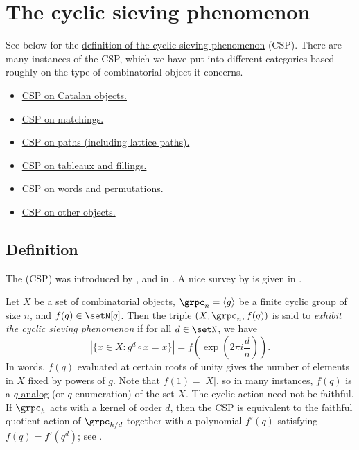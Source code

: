 

\section[cyclicSieving]{The cyclic sieving phenomenon}

See below for the \hyperref[cspDefinition]{definition of the cyclic sieving phenomenon} (CSP).
There are many instances of the CSP, which we have put into different categories
based roughly on the type of combinatorial object it concerns.
\begin{itemize}
\item \hyperref[cspCatalan]{CSP on Catalan objects.}
\item \hyperref[cspMatch]{CSP on matchings.}
\item \hyperref[cspPath]{CSP on paths (including lattice paths).}
\item \hyperref[cspTableau]{CSP on tableaux and fillings.}
\item \hyperref[cspWord]{CSP on words and permutations.}
\item \hyperref[cspMisc]{CSP on other objects.}
\end{itemize}


\subsection[cspDefinition]{Definition}

The  (CSP) was introduced by ,  and 
 in \cite{ReinerStantonWhite2004}. 
A nice survey by  is given in \cite{Sagan2011}.

Let $X$ be a set of combinatorial objects, $\grpc_n = \langle g \rangle$ be a finite cyclic group of size $n$, and $f(q) \in \setN[q]$.
Then the triple $(X,\grpc_n,f(q))$ is said to \emph{exhibit the cyclic sieving phenomenon} if for all $d \in \setN$, we have
\[
|\{x \in X : g^d \circ x =x \}| = f\left(\exp\left(2\pi i  \frac{d}{n}\right)\right).
\]
In words, $f(q)$ evaluated at certain roots of unity gives the number of elements in $X$ fixed by powers of $g$.
Note that $f(1) = |X|$, so in many instances, $f(q)$
is a \hyperref[qAnalogs]{$q$-analog} (or $q$-enumeration) of the set $X$.
The cyclic action need not be faithful.  If $\grpc_h$ acts with a kernel of
order $d$, then the CSP is equivalent to the faithful quotient action of
$\grpc_{h/d}$ together with a polynomial $f'(q)$ satisfying
$f(q)=f'(q^d)$; see \cite[Sec.~2.5]{BessisReiner2011}.


